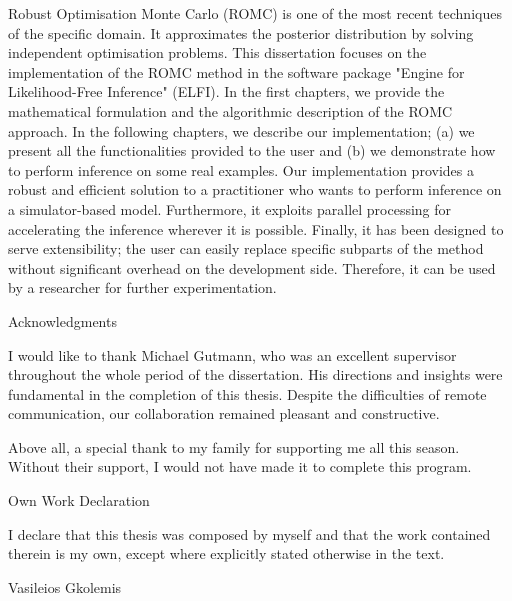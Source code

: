 \documentclass[11pt,twoside]{article}
\numberwithin{Theorem}{section}
\numberwithin{Definition}{section}
\numberwithin{Lemma}{section}
\numberwithin{Algorithm}{section}
\numberwithin{equation}{section}
\begin{document}
Robust Optimisation Monte Carlo (ROMC) is one of the most recent
techniques of the specific domain. It approximates the posterior
distribution by solving independent optimisation problems. This
dissertation focuses on the implementation of the ROMC method in the
software package "Engine for Likelihood-Free Inference" (ELFI). In the
first chapters, we provide the mathematical formulation and the
algorithmic description of the ROMC approach. In the following
chapters, we describe our implementation; (a) we present all the
functionalities provided to the user and (b) we demonstrate how to
perform inference on some real examples.  Our implementation provides 
a robust and efficient solution to a
practitioner who wants to perform inference on a simulator-based
model. Furthermore, it exploits parallel processing for accelerating the inference wherever it is possible. Finally, it has been designed to serve extensibility; the
user can easily replace specific subparts of the method without
significant overhead on the development side. Therefore, it can be
used by a researcher for further experimentation.



\clearpage

\begin{center}
\Large{Acknowledgments}
\end{center}

I would like to thank Michael Gutmann, who was an excellent supervisor
throughout the whole period of the dissertation.  His directions and
insights were fundamental in the completion of this thesis. Despite
the difficulties of remote communication, our collaboration remained
pleasant and constructive.

Above all, a special thank to my family for supporting me all this
season. Without their support, I would not have made it to complete
this program.

\clearpage

\begin{center}
\Large{Own Work Declaration}
\end{center}

\hfill

I declare that this thesis was composed by myself and that
the work contained therein is my own, except where explicitly stated
otherwise in the text.

\hfill

\hfill

Vasileios Gkolemis
\cleardoublepage
\end{document}
